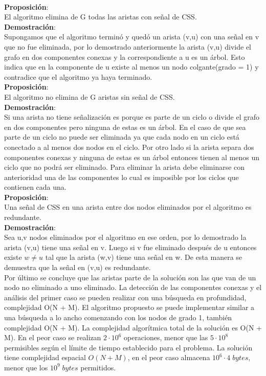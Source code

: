 \documentclass{report}
\begin{document}
\hspace{1cm}\\
{\bf Proposici\'on}:\\
El algoritmo elimina de G todas las aristas con se\~nal de CSS.\\
{\bf Demostraci\'on}:\\
Supongamos que el algoritmo termin\'o y qued\'o un arista (v,u) con una se\~nal en v que no fue eliminada, por lo demostrado anteriormente la arista (v,u) divide el grafo en dos componentes conexas y la correspondiente a u es un \'arbol. Esto indica que en la componente de u existe al menos un nodo colgante(grado = 1) y contradice que el algoritmo ya haya terminado.\\ 
{\bf Proposici\'on}:\\
El algoritmo no elimina de G aristas sin se\~nal de CSS.\\
{\bf Demostraci\'on}:\\
Si una arista no tiene se\~nalizaci\'on es porque es parte de un ciclo o divide el grafo en dos componentes pero ninguna de estas es un \'arbol. En el caso de que sea parte de un ciclo no puede ser eliminada ya que cada nodo en un ciclo est\'a conectado a al menos dos nodos en el ciclo. Por otro lado si la arista separa dos componentes conexas y ninguna de estas es un \'arbol entonces tienen al menos un ciclo que no podr\'a ser eliminado. Para eliminar la arista debe eliminarse con anterioridad una de las componentes lo cual es imposible por los ciclos que contienen cada una.\\
{\bf Proposici\'on}:\\
Una se\~nal de CSS en una arista entre dos nodos eliminados por el algoritmo es redundante.\\
{\bf Demostraci\'on}:\\
Sea u,v nodos eliminados por el algoritmo en ese orden, por lo demostrado la arista (v,u) tiene una se\~nal en v. Luego si v fue eliminado despu\'es de u entonces existe $w\ne u$ tal que la arista (w,v) tiene una se\~nal en w. De esta manera se demuestra que la se\~nal en (v,u) es redundante.\\
Por \'ultimo se concluye que las aristas parte de la soluci\'on son las que van de un nodo no eliminado a uno eliminado. La detecci\'on de las componentes conexas y el an\'alisis del primer caso se pueden realizar con una b\'usqueda en profundidad, complejidad O(N + M).
El algoritmo propuesto se puede implementar similar a una b\'usqueda a lo ancho comenzando con los nodos de grado 1, tambi\'en complejidad O(N + M). La complejidad algor\'itmica total de la soluci\'on es O(N + M). En el peor caso se realizan $2\cdot 10^6$ operaciones, menor que las $5 \cdot 10^8$ permisibles seg\'un el l\'imite de tiempo establecido para el problema. La soluci\'on tiene complejidad espacial $O(N + M)$, en el peor caso almacena $10^6 \cdot 4\; bytes$, menor que los $10^9 \;bytes$ permitidos.\\
\end{document}
